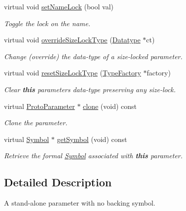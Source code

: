 \begin{DoxyCompactItemize}
virtual void \mbox{\hyperlink{class_parameter_basic_aad8993c75874c7ac36c92ce51f05434a}{set\+Name\+Lock}} (bool val)
\begin{DoxyCompactList}\small\item\em Toggle the lock on the name. \end{DoxyCompactList}\item 
virtual void \mbox{\hyperlink{class_parameter_basic_a1653c7aaf1e1883127707f4e25d7d564}{override\+Size\+Lock\+Type}} (\mbox{\hyperlink{class_datatype}{Datatype}} $\ast$ct)
\begin{DoxyCompactList}\small\item\em Change (override) the data-\/type of a {\itshape size-\/locked} parameter. \end{DoxyCompactList}\item 
virtual void \mbox{\hyperlink{class_parameter_basic_ac3aed750efa13f72a9a674ceb666eb9a}{reset\+Size\+Lock\+Type}} (\mbox{\hyperlink{class_type_factory}{Type\+Factory}} $\ast$factory)
\begin{DoxyCompactList}\small\item\em Clear {\bfseries{this}} parameter\textquotesingle{}s data-\/type preserving any {\itshape size-\/lock}. \end{DoxyCompactList}\item 
virtual \mbox{\hyperlink{class_proto_parameter}{Proto\+Parameter}} $\ast$ \mbox{\hyperlink{class_parameter_basic_af5f84234790a83cb3ca98c7155730355}{clone}} (void) const
\begin{DoxyCompactList}\small\item\em Clone the parameter. \end{DoxyCompactList}\item 
virtual \mbox{\hyperlink{class_symbol}{Symbol}} $\ast$ \mbox{\hyperlink{class_parameter_basic_ae3b74f1e127c354b6baabf69d2f36056}{get\+Symbol}} (void) const
\begin{DoxyCompactList}\small\item\em Retrieve the formal \mbox{\hyperlink{class_symbol}{Symbol}} associated with {\bfseries{this}} parameter. \end{DoxyCompactList}\end{DoxyCompactItemize}


\subsection{Detailed Description}
A stand-\/alone parameter with no backing symbol. 

